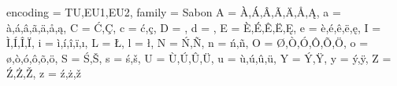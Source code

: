 \frenchspacing




\DeclareCharacterInheritance
   { encoding = {TU,EU1,EU2},
     family   = {Sabon} }
   { A = {\`A,\'A,\^A,\~A,\"A,\r A,\k A},
     a = {\`a,\'a,\^a,\~a,\"a,\r a,\k a},
     C = {\'C,\c C},
     c = {\'c,\c c},
     D = {\DH},
     d = {\dj},
     E = {\`E,\'E,\^E,\"E,\k E},
     e = {\`e,\'e,\^e,\"e,\k e},
     I = {\`I,\'I,\^I,\"I},
     i = {\`i,\'i,\^i,\"i,\i},
     L = {\L},
     l = {\l},
     N = {\'N,\~N},
     n = {\'n,\~n},
     O = {\O,\`O,\'O,\^O,\~O,\"O},
     o = {\o,\`o,\'o,\^o,\~o,\"o},
     S = {\'S,\v S},
     s = {\'s,\v s},
     U = {\`U,\'U,\^U,\"U},
     u = {\`u,\'u,\^u,\"u},
     Y = {\'Y,\"Y},
     y = {\'y,\"y},
     Z = {\'Z,\.Z,\v Z},
     z = {\'z,\.z,\v z}
   }
